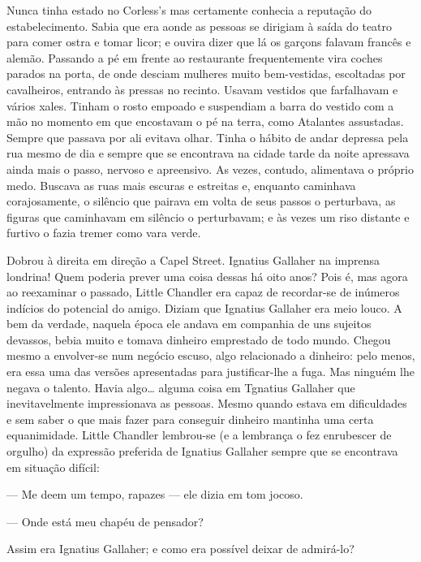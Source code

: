 Nunca tinha estado no Corless's mas certamente conhecia a reputação do
estabelecimento. Sabia que era aonde as pessoas se dirigiam à saída do
teatro para comer ostra e tomar licor; e ouvira
dizer que lá os garçons falavam francês e alemão. Passando a pé em
frente ao restaurante frequentemente vira coches parados na porta, de
onde desciam mulheres muito bem-vestidas, escoltadas por cavalheiros,
entrando às pressas no recinto. Usavam vestidos que farfalhavam e
vários xales. Tinham o rosto empoado e suspendiam a barra do vestido
com a mão no momento em que encostavam o pé na terra, como Atalantes
assustadas. Sempre que passava por ali evitava olhar. Tinha o hábito
de andar depressa pela rua mesmo de dia e sempre que se encontrava na
cidade tarde da noite apressava ainda mais o passo, nervoso e
apreensivo. As vezes, contudo, alimentava o próprio medo. Buscava as
ruas mais escuras e estreitas e, enquanto caminhava corajosamente, o
silêncio que pairava em volta de seus passos o perturbava, as
figuras que caminhavam em silêncio o perturbavam; e às vezes um riso
distante e furtivo o fazia tremer como vara verde.

Dobrou à direita em direção a Capel Street. Ignatius Gallaher na
imprensa londrina! Quem poderia prever uma coisa dessas há oito anos?
Pois é, mas agora ao reexaminar o passado, Little Chandler era capaz
de recordar-se de inúmeros indícios do potencial do amigo. Diziam
que Ignatius Gallaher era meio louco. A bem da verdade, naquela época
ele andava em companhia de uns sujeitos devassos, bebia muito e tomava
dinheiro emprestado de todo mundo. Chegou mesmo a envolver-se num
negócio escuso, algo relacionado a dinheiro: pelo menos, era essa uma
das versões apresentadas para justificar-lhe a fuga. Mas ninguém lhe
negava o talento. Havia algo\ldots{} alguma coisa em Tgnatius Gallaher que
inevitavelmente impressionava as pessoas. Mesmo quando estava em
dificuldades e sem saber o que mais fazer para conseguir dinheiro
mantinha uma certa equanimidade. Little Chandler lembrou-se (e a
lembrança o fez enrubescer de orgulho) da expressão preferida de
Ignatius Gallaher sempre que se encontrava em situação difícil:

--- Me deem um tempo, rapazes --- ele dizia em tom jocoso.

--- Onde está meu chapéu de pensador?

Assim era Ignatius Gallaher; e como era possível deixar de admirá-lo?

